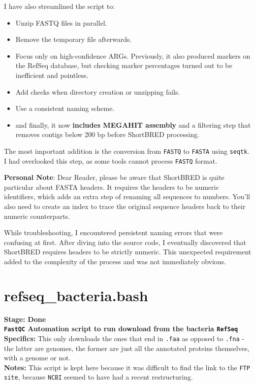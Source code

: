 \documentclass[11pt]{report}
\begin{document}
{\begin{tcolorbox}[title=Sept 20 2024 Update, coltitle=white]
	I have also streamlined the script to:
	\begin{itemize}
		\item Unzip FASTQ files in parallel.
		\item Remove the temporary file afterwards.
		\item Focus only on high-confidence ARGs. Previously, it also produced markers on the RefSeq database, but checking marker percentages turned out to be inefficient and pointless.
		\item Add checks when directory creation or unzipping fails.
		\item Use a consistent naming scheme.
		\item and finally, it now \textbf{includes MEGAHIT assembly} and a filtering step that removes contigs below 200 bp before ShortBRED processing.
	\end{itemize}
	
	The most important addition is the conversion from \texttt{FASTQ} to \texttt{FASTA} using \texttt{seqtk}. I had overlooked this step, as some tools cannot process \texttt{FASTQ} format.
	
	\medskip
	
\textbf{Personal Note}: Dear Reader, please be aware that ShortBRED is quite particular about FASTA headers. It requires the headers to be numeric identifiers, which adds an extra step of renaming all sequences to numbers. You'll also need to create an index to trace the original sequence headers back to their numeric counterparts.

While troubleshooting, I encountered persistent naming errors that were confusing at first. After diving into the source code, I eventually discovered that ShortBRED requires headers to be strictly numeric. This unexpected requirement added to the complexity of the process and was not immediately obvious.

	
\end{tcolorbox}

\linenumbers*
\section{refseq\_bacteria.bash}
\textbf{Stage: Done} \\   
\textbf{\texttt{FastQC} Automation script to run download from the bacteria \texttt{RefSeq}} \\
\textbf{Specifics:} This only downloads the ones that end in \texttt{.faa} as opposed to \texttt{.fna} - the latter are genomes, the former are just all the annotated proteins themselves, with a genome or not. \\
\textbf{Notes:} This script is kept here because it was difficult to find the link to the \texttt{FTP site}, because \texttt{NCBI} seemed to have had a recent restructuring. 

}
\end{document}
